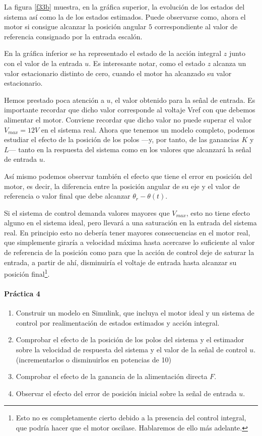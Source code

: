 \documentclass[10pt,a4paper]{report}
\begin{document}
La figura \ref{f33b} muestra, en la gráfica superior, la evolución de los estados del sistema así como la de los estados estimados. Puede observarse como, ahora el motor si consigue alcanzar la posición angular $5$ correspondiente al valor de referencia consignado por la entrada escalón.

En la gráfica inferior se ha representado el estado de la  acción integral $z$ junto con el valor de la entrada $u$. Es interesante notar, como el estado $z$ alcanza un valor estacionario distinto de cero, cuando el motor ha alcanzado su valor estacionario.

Hemos prestado poca atención a $u$, el valor obtenido para la señal de entrada. Es importante recordar que dicho valor corresponde al voltaje Vref con que debemos alimentar el motor.  Conviene recordar que dicho valor no puede superar el valor $V_{max}=12V$ en el sistema real. Ahora que tenemos un modelo completo, podemos estudiar el efecto de la posición de los polos ---y, por tanto, de las ganancias $K$ y $L$--- tanto en la respuesta del sistema como en los valores que alcanzará la señal de entrada $u$. 

Así mismo podemos observar también el efecto que tiene el error en posición del motor, es decir, la diferencia entre la posición angular de su eje y el valor de referencia o valor final que debe alcanzar $\theta_r-\theta(t)$.

Si el sistema de control demanda valores mayores que $V_{max}$, esto no tiene efecto alguno en el sistema ideal, pero llevará a una saturación en la entrada del sistema real. En principio esto no debería tener mayores consecuencias en el motor real, que simplemente giraría a velocidad máxima hasta acercarse lo suficiente al valor de referencia de la posición como para que la acción de control deje de saturar la entrada, a partir de ahí, disminuiría el voltaje de entrada hasta alcanzar su posición final\footnote{Esto no es completamente cierto debido a la presencia del control integral, que podría hacer que el motor oscilase. Hablaremos de ello más adelante.}.
  
\paragraph{Práctica 4}
\begin{enumerate}
\item Construir un modelo en Simulink, que incluya el motor ideal y un sistema de control por realimentación de estados estimados y acción integral. 
\item Comprobar el efecto de la posición de los polos del sistema y el estimador sobre la velocidad de respuesta del sistema y el valor de la señal de control $u$. (incrementarlos o disminuirlos en potencias de 10)
\item Comprobar el efecto de la ganancia de la alimentación directa $F$.
\item Observar el efecto del error de posición inicial sobre la señal de entrada $u$. 
\end{enumerate}
\end{document}
